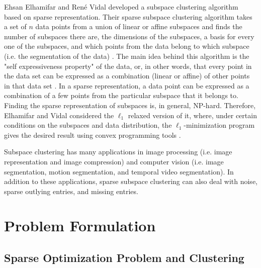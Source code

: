 \documentclass{article}
\begin{document}
Ehsan Elhamifar and Ren\'e Vidal developed a subspace clustering algorithm based on sparse representation. Their sparse subspace clustering algorithm takes a set of $n$ data points from a union of linear or affine subspaces and finds the number of subspaces there are, the dimensions of the subspaces, a basis for every one of the subspaces, and which points from the data belong to which subspace (i.e. the segmentation of the data) \cite{elhamifar2012sparse}. The main idea behind this algorithm is the "self expressiveness property" of the data, or, in other words, that every point in the data set can be expressed as a combination (linear or affine) of other points in that data set \cite{elhamifar2012sparse}. In a sparse representation, a data point can be expressed as a combination of a few points from the particular subspace that it belongs to. Finding the sparse representation of subspaces is, in general, NP-hard. Therefore, Elhamifar and Vidal considered the $\ell_1$ relaxed version of it, where, under certain conditions on the subspaces and data distribution, the $\ell_1$-minimization program gives the desired result using convex programming tools \cite{SSC-CVPR09-Ehsan}. 

Subspace clustering has many applications in image processing (i.e. image representation and image compression) and computer vision (i.e. image segmentation, motion segmentation, and temporal video segmentation). In addition to these applications, sparse subspace clustering can also deal with noise, sparse outlying entries, and missing entries.

\section{Problem Formulation}

\subsection{Sparse Optimization Problem and Clustering}
\end{document}
